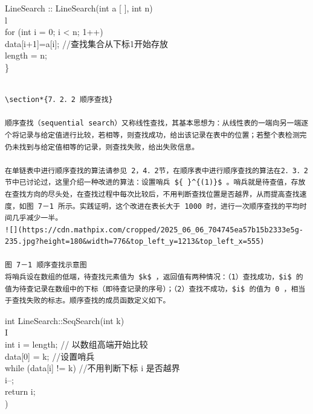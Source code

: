 \documentclass[10pt]{article}
\begin{document}
\begin{verbatim}

\end{verbatim}

LineSearch :: LineSearch(int a [ ], int n)\\
l\\
for (int i = 0; i < n; 1++)\\[0pt]
data[i+1]=a[i]; //查找集合从下标1开始存放\\
length = n;\\
\}

\begin{verbatim}

\section*{7．2．2 顺序查找}

顺序查找（sequential search）又称线性查找，其基本思想为：从线性表的一端向另一端逐个将记录与给定值进行比较，若相等，则查找成功，给出该记录在表中的位置；若整个表检测完仍未找到与给定值相等的记录，则查找失败，给出失败信息。

在单链表中进行顺序查找的算法请参见 2，4．2节，在顺序表中进行顺序查找的算法在2．3．2节中已讨论过，这里介绍一种改进的算法：设置哨兵 ${ }^{(1)}$ 。哨兵就是待查值，存放在查找方向的尽头处，在查找过程中每次比较后，不用判断查找位置是否越界，从而提高查找速度，如图 7－1 所示。实践证明，这个改进在表长大于 1000 时，进行一次顺序查找的平均时间几乎减少一半。
![](https://cdn.mathpix.com/cropped/2025_06_06_704745ea57b15b2333e5g-235.jpg?height=180&width=776&top_left_y=1213&top_left_x=555)

图 7－1 顺序查找示意图
将哨兵设在数组的低端，待查找元素值为 $k$ ，返回值有两种情况：（1）查找成功，$i$ 的值为待查记录在数组中的下标（即待查记录的序号）；（2）查找不成功，$i$ 的值为 0 ，相当于查找失败的标志。顺序查找的成员函数定义如下。
\end{verbatim}

int LineSearch::SeqSearch(int k)\\
I\\
int i = length; // 以数组高端开始比较\\[0pt]
data[0] = k; //设置哨兵\\[0pt]
while (data[i] != k) //不用判断下标 i 是否越界\\
i--;\\
return i;\\
)
\end{document}
